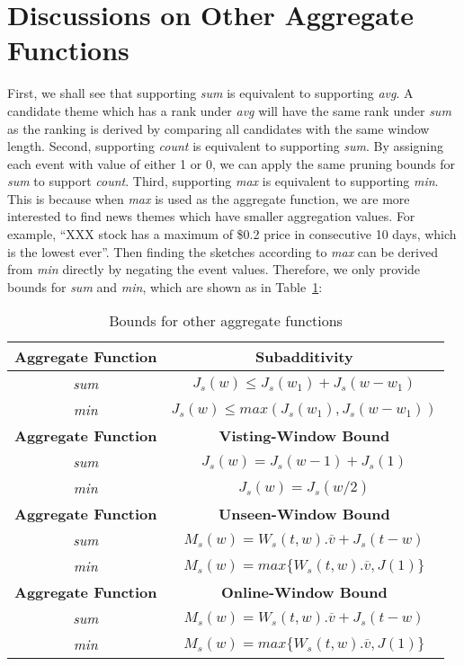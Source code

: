\section{Discussions on Other Aggregate Functions}
\label{sec:discussion}
First, we shall see that supporting \emph{sum} is equivalent
to supporting \emph{avg}. 
A candidate theme which has a rank under \emph{avg} will have the 
same rank under \emph{sum} as the ranking is derived by comparing all 
candidates with the same window length. 
%
Second, supporting \emph{count} is equivalent to supporting \emph{sum}. 
By assigning each event with value of either 1 or 0, we can apply the 
same pruning bounds for \emph{sum} to support \emph{count}. 
%
Third, supporting \emph{max} is equivalent to supporting \emph{min}. This is 
because when \emph{max} is used as the aggregate function, we are more interested 
to find news themes which have smaller aggregation values. 
For example, ``XXX stock has a maximum of \$0.2 price
in consecutive 10 days, which is the lowest ever''. Then finding the sketches according to \emph{max} 
can be derived from \emph{min} directly by negating the event values. 
Therefore, we only provide bounds for 
\emph{sum} and \emph{min}, which are shown as in Table~\ref{tbl:agg_bound}:
%
{\renewcommand{\arraystretch}{1.2} 
\begin{table}[h]
\caption{Bounds for other aggregate functions}
\centering
\begin{tabular}{|c|c|}
\hline 
\textbf{Aggregate Function} & \textbf{Subadditivity} \\
\hline 
\emph{sum} & $J_s(w) \leq J_s(w_1) + J_s(w-w_1) $ \\
\emph{min} & $J_s(w) \leq max(J_s(w_1), J_s(w-w_1))$ \\
\hline 
\textbf{Aggregate Function} & \textbf{Visting-Window Bound} \\
\hline 
\emph{sum} & $J_s(w) = J_s(w-1)+J_s(1)$ \\
\emph{min} & $J_s(w) = J_s(w/2)$ \\
\hline 
\textbf{Aggregate Function}& \textbf{Unseen-Window Bound} \\
\hline 
\emph{sum} & $M_s(w) = W_s(t,w).\overline{v} + J_s(t-w)$ \\
\emph{min} & $M_s(w) = max\{W_s(t,w).\overline{v}, J(1)\}$ \\
\hline 
\textbf{Aggregate Function }& \textbf{Online-Window Bound} \\
\hline 
\emph{sum} & $M_s(w) = W_s(t,w).\overline{v} + J_s(t-w)$ \\
\emph{min} & $M_s(w) = max\{W_s(t,w).\overline{v}, J(1)\}$ \\
\hline 
\end{tabular} 
\label{tbl:agg_bound}
\end{table}
}

